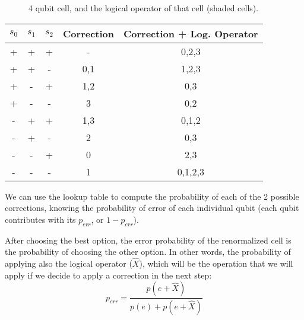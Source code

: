 \documentclass[a4paper,12pt]{article}
\begin{document}
\begin{figure}[ht!]
\begin{center}
\caption{4 qubit cell, and the logical operator of that cell (shaded cells).}

\end{center}
\end{figure}
\begin{table}
\begin{center}
\begin{tabular}{|ccc|c|c|}
\hline
$s_0$&$s_1$	&$s_2$&Correction&Correction + Log. Operator\\
\hline
+	&+	&+	&-	&0,2,3	\\
+	&+	&-	&0,1	&1,2,3	\\
+	&-	&+	&1,2	&0,3		\\
+	&-	&-	&3	&0,2		\\
-	&+	&+	&1,3	&0,1,2	\\
-	&+	&-	&2	&0,3		\\
-	&-	&+	&0	&2,3		\\
-	&-	&-	&1	&0,1,2,3	\\
\hline
\end{tabular}
\end{center}
\end{table}

We can use the lookup table to compute the probability of each of the 2 possible corrections, knowing the probability of error of each individual qubit (each qubit contributes with its $p_{err}$, or $1-p_{err}$).


After choosing the best option, the error probability of the renormalized cell is the probability of choosing the other option. In other words, the probability of applying also the logical operator ($\hat{X}$), which will be the operation that we will apply if we decide to apply a correction in the next step:
\begin{equation}
p_{err}=\frac{p(e+\hat{X})}{p(e)+p(e+\hat{X})}
\end{equation}


%




\end{document}
